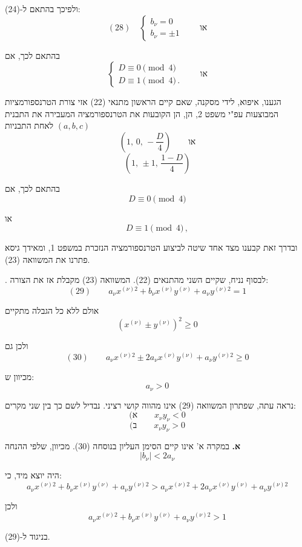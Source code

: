 \noindent ולפיכך בהתאם ל-(24):
\[ (28) \quad \left\{ \begin{array}{l}
b_\nu = 0 \\
b_\nu = \pm 1
\end{array} \right. \qquad \text{או} \]

\noindent בהתאם לכך, אם
\[ \left\{ \begin{array}{l}
D \equiv 0 \pmod{4} \\
D \equiv 1 \pmod{4} \, .
\end{array} \right. \qquad \text{או} \]

\noindent הגענו, איפוא, לידי מסקנה, שאם קיים הראשון מתנאי (22) אזי
צורת הטרנספורמציות המבוצעות עפ"י משפט 2, הן, הן הקובעות את
הטרנספורמציה המעבירה את התבנית $(a,b,c)$ לאחת התבניות
\[ \left(1,\, 0,\, -\dfrac{D}{4}\right) \qquad \text{או} \]
\[ \left(1,\, \pm 1,\, \dfrac{1-D}{4}\right) \]

\noindent בהתאם לכך, אם
\[ D \equiv 0 \pmod{4} \]

\noindent או
\[ D \equiv 1 \pmod{4} \, , \]

\noindent ובדרך זאת קבענו מצד אחד שיטה לביצוע הטרנספורמציה הנזכרת
במשפט 1, ומאידך גיסא פתרנו את המשוואה (23).

\medskip
{}. לבסוף נניח, שקיים השני מהתנאים (22). המשוואה (23) מקבלת
אז את הצורה:
\[ (29) \qquad a_\nu x^{(\nu)2} + b_\nu x^{(\nu)} y^{(\nu)} + a_\nu y^{(\nu)2} = 1 \]

\noindent אולם ללא כל הגבלה מתקיים
\[ \left(x^{(\nu)} \pm y^{(\nu)}\right)^2 \ge 0 \]

\noindent ולכן גם
\[ (30) \qquad a_\nu x^{(\nu)2} \pm 2a_\nu x^{(\nu)} y^{(\nu)} + a_\nu y^{(\nu)2} \ge 0 \]

\noindent מכיוון ש:
\[ a_\nu > 0 \]

\noindent נראה עתה, שפתרון המשוואה (29) אינו מהווה קושי רציני.
נבדיל לשם כך בין שני מקרים:
\[ \text{(א} \qquad x_\nu y_\nu < 0 \]
\[ \text{(ב} \qquad x_\nu y_\nu > 0 \]

\noindent \textbf{א.} במקרה א' אינו קיים הסימן העליון בנוסחה (30).
מכיוון, שלפי ההנחה
\[ |b_\nu| < 2a_\nu \]

\noindent היה יוצא מיד, כי:
\[ a_\nu x^{(\nu)2} + b_\nu x^{(\nu)} y^{(\nu)} + a_\nu y^{(\nu)2} >
a_\nu x^{(\nu)2} + 2a_\nu x^{(\nu)} y^{(\nu)} + a_\nu y^{(\nu)2} \]

\noindent ולכן
\[ a_\nu x^{(\nu)2} + b_\nu x^{(\nu)} y^{(\nu)} + a_\nu y^{(\nu)2} > 1 \]

\noindent בניגוד ל-(29).

